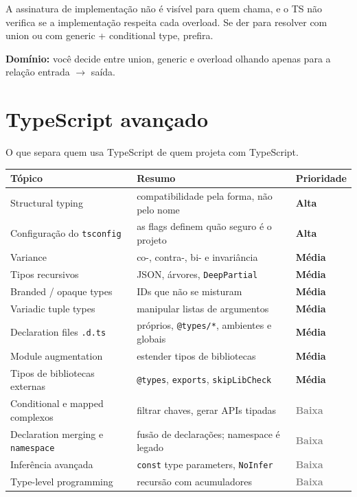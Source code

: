 \documentclass[12pt,a4paper,oneside]{book}
\newcommand{\Ta}{\textcolor{red!70!black}{\sffamily\bfseries Alta}}
\newcommand{\Tm}{\textcolor{orange!80!black}{\sffamily\bfseries Média}}
\newcommand{\Tb}{\textcolor{gray}{\sffamily\bfseries Baixa}}
\newcommand{\code}[1]{\texttt{#1}}
\newcommand{\dom}[1]{\begin{dominio}\textbf{Domínio:} #1\end{dominio}}
\begin{document}
\begin{cuidado}
A assinatura de implementação não é visível para quem chama, e o TS não verifica se a implementação respeita cada overload. Se der para resolver com union ou com generic + conditional type, prefira.
\end{cuidado}

\dom{você decide entre union, generic e overload olhando apenas para a relação entrada $\rightarrow$ saída.}

\chapter{TypeScript avançado}
\label{cap:tsavancado}

O que separa quem usa TypeScript de quem projeta com TypeScript.

{\small
\begin{tabularx}{\textwidth}{@{}lXl@{}}
\toprule
\textbf{Tópico} & \textbf{Resumo} & \textbf{Prioridade} \\
\midrule
Structural typing & compatibilidade pela forma, não pelo nome & \Ta \\
Configuração do \code{tsconfig} & as flags definem quão seguro é o projeto & \Ta \\
Variance & co-, contra-, bi- e invariância & \Tm \\
Tipos recursivos & JSON, árvores, \code{DeepPartial} & \Tm \\
Branded / opaque types & IDs que não se misturam & \Tm \\
Variadic tuple types & manipular listas de argumentos & \Tm \\
Declaration files \code{.d.ts} & próprios, \code{@types/*}, ambientes e globais & \Tm \\
Module augmentation & estender tipos de bibliotecas & \Tm \\
Tipos de bibliotecas externas & \code{@types}, \code{exports}, \code{skipLibCheck} & \Tm \\
Conditional e mapped complexos & filtrar chaves, gerar APIs tipadas & \Tb \\
Declaration merging e \code{namespace} & fusão de declarações; namespace é legado & \Tb \\
Inferência avançada & \code{const} type parameters, \code{NoInfer} & \Tb \\
Type-level programming & recursão com acumuladores & \Tb \\
\bottomrule
\end{tabularx}
}
\end{document}
